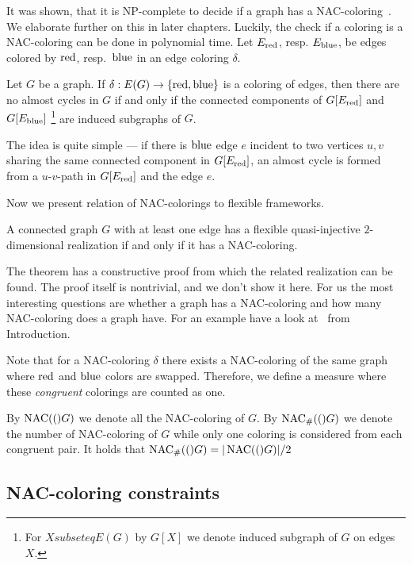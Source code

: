 It was shown, that it is NP-complete to decide if a graph has a NAC-coloring~\cite{np_complete}.
We elaborate further on this in later chapters.
Luckily, the check if a coloring is a NAC-coloring can be done in polynomial time.
Let \( E_{\text{red}}\), resp. \( E_{\text{blue}} \), be edges colored by \( \text{red} \), resp.~\( \text{blue} \)
in an edge coloring \( \delta \).
%
\begin{lemma}
	Let \( G \) be a graph. If \( \delta: E(G) \to \{ \text{red}, \text{blue} \} \) is a coloring of edges,
	then there are no almost cycles in \( G \) if and only if the connected components
	of \( G[E_{\text{red}}] \) and \( G[E_{\text{blue}}] \)%
	\footnote{For \(X subseteq E(G)\) by \(G[X]\) we denote induced subgraph of \( G \) on edges \( X \).}
	are induced subgraphs of \( G \).
\end{lemma}
%
The idea is quite simple --- if there is \WLOG{} \( \text{blue} \) edge \( e \) incident to
two vertices \( u, v \) sharing the same connected component in \( G[E_{\text{red}}] \),
an almost cycle is formed from a \( u \)-\( v \)-path in \( G[E_{\text{red}}] \)
and the edge \( e \).

Now we present relation of NAC-colorings to flexible frameworks.
%
\begin{theorem}
	A connected graph \( G \) with at least one edge has a flexible
	quasi-injective \( 2 \)-dimensional realization if and only if it has a NAC-coloring.
\end{theorem}
%
The theorem has a constructive proof from which the related realization can be found.
The proof itself is nontrivial, and we don't show it here.
For us the most interesting questions are whether a graph has a NAC-coloring
and how many NAC-coloring does a graph have.
For an example have a look at~
from Introduction.

Note that for a NAC-coloring \( \delta \) there exists a NAC-coloring of the same
graph where \( \text{red} \) and \( \text{blue} \) colors are swapped.
Therefore, we define a measure where these \emph{congruent} colorings are
counted as one.
%
\begin{definition}
	By \( \operatorname{NAC}(()G) \) we denote all the NAC-coloring of \( G \).
	By \( \operatorname{NAC}_{\#} (()G) \) we denote the number of NAC-coloring of \( G \)
	while only one coloring is considered from each congruent pair.
	It holds that \( \operatorname{NAC}_{\#} (()G) = | \operatorname{NAC}(()G) | / 2 \)
\end{definition}
%

\subsection{NAC-coloring constraints}

